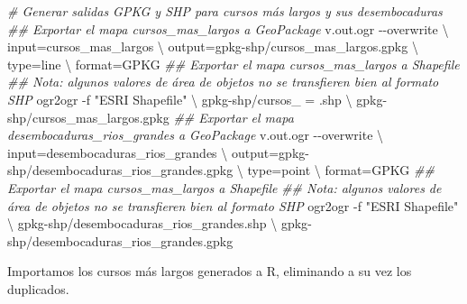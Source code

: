 \documentclass[spanish]{article}
\newenvironment{Shaded}{\begin{snugshade}}{\end{snugshade}}
\newcommand{\AttributeTok}[1]{\textcolor[rgb]{0.77,0.63,0.00}{#1}}
\newcommand{\CommentTok}[1]{\textcolor[rgb]{0.56,0.35,0.01}{\textit{#1}}}
\newcommand{\DataTypeTok}[1]{\textcolor[rgb]{0.13,0.29,0.53}{#1}}
\newcommand{\ExtensionTok}[1]{#1}
\newcommand{\FunctionTok}[1]{\textcolor[rgb]{0.00,0.00,0.00}{#1}}
\newcommand{\NormalTok}[1]{#1}
\newcommand{\OtherTok}[1]{\textcolor[rgb]{0.56,0.35,0.01}{#1}}
\newcommand{\SpecialCharTok}[1]{\textcolor[rgb]{0.00,0.00,0.00}{#1}}
\newcommand{\StringTok}[1]{\textcolor[rgb]{0.31,0.60,0.02}{#1}}
\begin{document}
\begin{Shaded}
\begin{Highlighting}[]
\CommentTok{\# Generar salidas GPKG y SHP para cursos más largos y sus desembocaduras}
\CommentTok{\#\# Exportar el mapa \textquotesingle{}cursos\_mas\_largos\textquotesingle{} a GeoPackage}
\ExtensionTok{v.out.ogr} \AttributeTok{{-}{-}overwrite} \DataTypeTok{\textbackslash{}}
\NormalTok{  input=cursos\_mas\_largos }\DataTypeTok{\textbackslash{}}
\NormalTok{  output=gpkg{-}shp/cursos\_mas\_largos.gpkg }\DataTypeTok{\textbackslash{}}
\NormalTok{  type=line }\DataTypeTok{\textbackslash{}}
\NormalTok{  format=GPKG}
\CommentTok{\#\# Exportar el mapa \textquotesingle{}cursos\_mas\_largos\textquotesingle{} a Shapefile}
\CommentTok{\#\# Nota: algunos valores de área de objetos no se transfieren bien al formato SHP}
\ExtensionTok{ogr2ogr} \AttributeTok{{-}f} \StringTok{"ESRI Shapefile"} \DataTypeTok{\textbackslash{}}
\NormalTok{  gpkg{-}shp/cursos\_ = .shp }\DataTypeTok{\textbackslash{}}
\NormalTok{  gpkg{-}shp/cursos\_mas\_largos.gpkg}
\CommentTok{\#\# Exportar el mapa \textquotesingle{}desembocaduras\_rios\_grandes\textquotesingle{} a GeoPackage}
\ExtensionTok{v.out.ogr} \AttributeTok{{-}{-}overwrite} \DataTypeTok{\textbackslash{}}
\NormalTok{  input=desembocaduras\_rios\_grandes }\DataTypeTok{\textbackslash{}}
\NormalTok{  output=gpkg{-}shp/desembocaduras\_rios\_grandes.gpkg }\DataTypeTok{\textbackslash{}}
\NormalTok{  type=point }\DataTypeTok{\textbackslash{}}
\NormalTok{  format=GPKG}
\CommentTok{\#\# Exportar el mapa \textquotesingle{}cursos\_mas\_largos\textquotesingle{} a Shapefile}
\CommentTok{\#\# Nota: algunos valores de área de objetos no se transfieren bien al formato SHP}
\ExtensionTok{ogr2ogr} \AttributeTok{{-}f} \StringTok{"ESRI Shapefile"} \DataTypeTok{\textbackslash{}}
\NormalTok{  gpkg{-}shp/desembocaduras\_rios\_grandes.shp }\DataTypeTok{\textbackslash{}}
\NormalTok{  gpkg{-}shp/desembocaduras\_rios\_grandes.gpkg}
\end{Highlighting}
\end{Shaded}

Importamos los cursos más largos generados a R, eliminando a su vez los
duplicados.

\begin{Shaded}
\end{Shaded}
\end{document}
